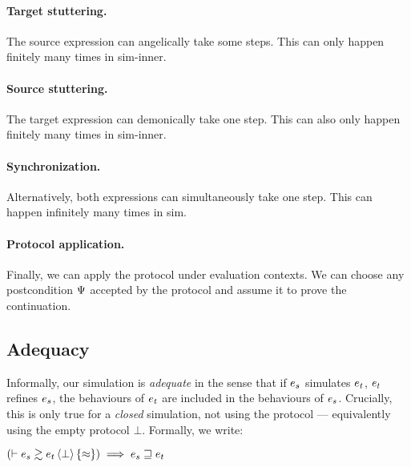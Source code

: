 \paragraph{ Target stuttering.}
The source expression can angelically take some steps.
This can only happen finitely many times in \textcolor{\iSimLfpColor}{sim-inner}.

\paragraph{ Source stuttering.}
The target expression can demonically take one step.
This can also only happen finitely many times in \textcolor{\iSimLfpColor}{sim-inner}.

\paragraph{ Synchronization.}
Alternatively, both expressions can simultaneously take one step.
This can happen infinitely many times in \textcolor{\iSimGfpColor}{sim}.

\paragraph{ Protocol application.}
Finally, we can apply the protocol under evaluation contexts.
We can choose any postcondition $\Psi$ accepted by the protocol and assume it to prove the continuation.

\subsection{Adequacy}

Informally, our simulation is \emph{adequate} in the sense that if $\datalangExpr_s$ simulates $\datalangExpr_t$, $\datalangExpr_t$ refines $\datalangExpr_s$, \ie the behaviours of $\datalangExpr_t$ are included in the behaviours of $\datalangExpr_s$.
Crucially, this is only true for a \emph{closed} simulation, \ie not using the protocol --- equivalently using the empty protocol $\bot$.
Formally, we write:

\begin{lemma} \label{thm:adequacy}
    $
        \left( \vdash \iSimv[\bot]{\iSimilar}{\datalangExpr_s}{\datalangExpr_t} \right) \implies
        \datalangExpr_s \refined \datalangExpr_t
    $
\end{lemma}

